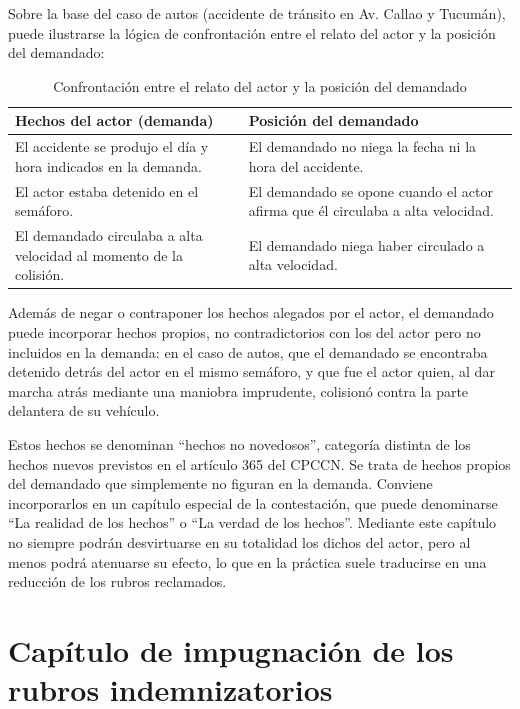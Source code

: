 \documentclass[12pt,oneside]{book}
\begin{document}
Sobre la base del caso de autos (accidente de tránsito en Av. Callao y Tucumán), puede ilustrarse la lógica de confrontación entre el relato del actor y la posición del demandado:

\begin{table}[H]
\centering
\caption{Confrontación entre el relato del actor y la posición del demandado}
\begin{tabularx}{\textwidth}{>{\raggedright\arraybackslash}X >{\raggedright\arraybackslash}X}
\toprule
\textbf{Hechos del actor (demanda)} & \textbf{Posición del demandado} \\
\midrule
El accidente se produjo el día y hora indicados en la demanda. & El demandado no niega la fecha ni la hora del accidente. \\
El actor estaba detenido en el semáforo. & El demandado se opone cuando el actor afirma que él circulaba a alta velocidad. \\
El demandado circulaba a alta velocidad al momento de la colisión. & El demandado niega haber circulado a alta velocidad. \\
\bottomrule
\end{tabularx}
\end{table}

Además de negar o contraponer los hechos alegados por el actor, el demandado puede incorporar hechos propios, no contradictorios con los del actor pero no incluidos en la demanda: en el caso de autos, que el demandado se encontraba detenido detrás del actor en el mismo semáforo, y que fue el actor quien, al dar marcha atrás mediante una maniobra imprudente, colisionó contra la parte delantera de su vehículo.

\begin{note}
Estos hechos se denominan ``hechos no novedosos'', categoría distinta de los hechos nuevos previstos en el artículo 365 del CPCCN. Se trata de hechos propios del demandado que simplemente no figuran en la demanda. Conviene incorporarlos en un capítulo especial de la contestación, que puede denominarse ``La realidad de los hechos'' o ``La verdad de los hechos''. Mediante este capítulo no siempre podrán desvirtuarse en su totalidad los dichos del actor, pero al menos podrá atenuarse su efecto, lo que en la práctica suele traducirse en una reducción de los rubros reclamados.
\end{note}

\section{Capítulo de impugnación de los rubros indemnizatorios}
\end{document}

